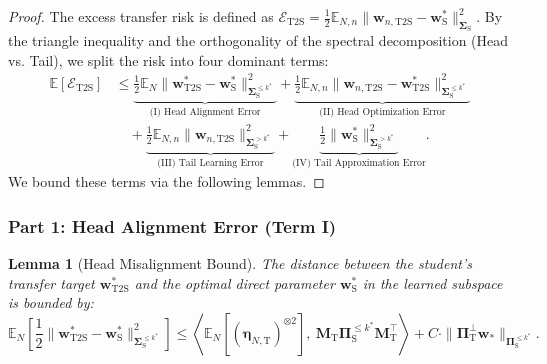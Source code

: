 \documentclass{article}
\theoremstyle{definition}
\theoremstyle{definition}
\theoremstyle{plain}
\theoremstyle{plain}
\theoremstyle{plain}
\newtheorem{lemma}{Lemma}
\theoremstyle{plain}
\theoremstyle{plain}
\newcommand{\bs}[1]{\boldsymbol{\mathbf{#1}}}
\newcommand{\Ex}{\mathbb{E}}
\newcommand{\te}{\mathrm{T}}
\newcommand{\st}{\mathrm{S}}
\newcommand{\ts}{\mathrm{T2S}}
\newcommand{\M}{\mathbf{M}}
\newcommand{\Sig}{\mathbf{\Sigma}}
\newcommand{\w}{\mathbf{w}}
\newcommand{\ex}[2][]{\mathbb{E}_{#1}\left[ #2 \right]}
\newcommand{\inner}[1]{\left\langle#1\right\rangle}
\begin{document}
\begin{proof}
    The excess transfer risk is defined as $\mathcal{E}_{\mathrm{T2S}} = \frac{1}{2} \Ex_{N,n} \|\w_{n,\ts} - \w^*_\st\|_{\bs\Sigma_\st}^2$. By the triangle inequality and the orthogonality of the spectral decomposition (Head vs. Tail), we split the risk into four dominant terms:
    \begin{equation}
    \begin{aligned}
        \Ex[\mathcal{E}_{\mathrm{T2S}}] &\leq \underbrace{\frac{1}{2}\Ex_N \|\w^*_\ts - \w^*_\st\|_{\Sig_\st^{\leq k^*}}^2}_{\text{(I) Head Alignment Error}}
        + \underbrace{\frac{1}{2}\Ex_{N,n} \|\w_{n,\ts} - \w^*_\ts\|_{\Sig_\st^{\leq k^*}}^2}_{\text{(II) Head Optimization Error}} \\
        &\quad + \underbrace{\frac{1}{2}\Ex_{N,n} \|\w_{n,\ts}\|_{\Sig_\st^{> k^*}}^2}_{\text{(III) Tail Learning Error}}
        + \underbrace{\frac{1}{2} \|\w^*_\st\|_{\Sig_\st^{> k^*}}^2}_{\text{(IV) Tail Approximation Error}}.
    \end{aligned}
    \end{equation}
    We bound these terms via the following lemmas.
\end{proof}

\subsubsection*{Part 1: Head Alignment Error (Term I)}

\begin{lemma}[Head Misalignment Bound]
\label{lem:head_misalignment}
    The distance between the student's transfer target $\w^*_\ts$ and the optimal direct parameter $\w^*_\st$ in the learned subspace is bounded by:
    \begin{equation}
        \ex[N]{\frac{1}{2}\|\w^*_\ts-\w^*_\st\|_{\Sig_\st^{\leq k^*}}^2} \leq \inner{\ex[N]{(\bs\eta_{N,\te})^{\otimes 2}},\ \M_\te\bs \Pi_{\st}^{\leq k^*}\M_\te^\top} + C\cdot \|\bs \Pi_{\te}^{\perp}\w_*\|_{\bs \Pi_{\st}^{\leq k^*}}.
    \end{equation}
\end{lemma}
\end{document}
